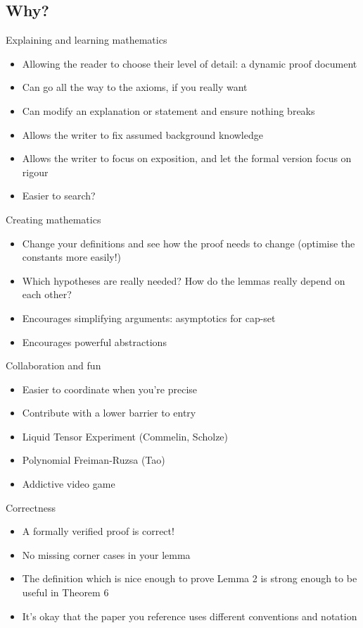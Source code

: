 \documentclass[usenames,dvipsnames,handout]{beamer}
\begin{document}
\subsection{Why?}
\begin{frame}{Explaining and learning mathematics}
  \begin{itemize}[<+->]
    \item Allowing the reader to choose their level of detail: a dynamic proof document
    \item Can go all the way to the axioms, if you really want
    \item Can modify an explanation or statement and ensure nothing breaks
    \item Allows the writer to fix assumed background knowledge
    \item Allows the writer to focus on exposition, and let the formal version focus on rigour
    \item Easier to search?
  \end{itemize}
\end{frame}
\begin{frame}{Creating mathematics}
  \begin{itemize}[<+->]
    \item Change your definitions and see how the proof needs to change (optimise the constants more easily!)
    \item Which hypotheses are really needed? How do the lemmas really depend on each other?
    \item Encourages simplifying arguments: asymptotics for cap-set
    \item Encourages powerful abstractions
  \end{itemize}
\end{frame}
\begin{frame}{Collaboration and fun}
  \begin{itemize}[<+->]
    \item Easier to coordinate when you're precise
    \item Contribute with a lower barrier to entry
    \item Liquid Tensor Experiment (Commelin, Scholze)
    \item Polynomial Freiman-Ruzsa (Tao)
    \item Addictive video game
  \end{itemize}
\end{frame}
\begin{frame}{Correctness}
  \begin{itemize}[<+->]
    \item A formally verified proof is correct!
    \item No missing corner cases in your lemma
    \item The definition which is nice enough to prove Lemma 2 is strong enough to be useful in Theorem 6
    \item It's okay that the paper you reference uses different conventions and notation
  \end{itemize}
\end{frame}
\end{document}
